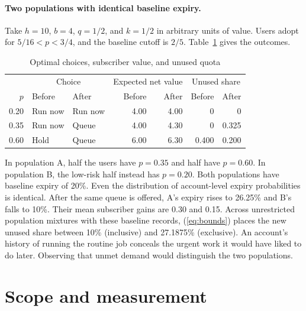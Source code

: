 \documentclass[11pt]{article}
\begin{document}
\paragraph{Two populations with identical baseline expiry.}
Take $h=10$, $b=4$, $q=1/2$, and $k=1/2$ in arbitrary units of value. Users adopt for $5/16<p<3/4$, and the baseline cutoff is $2/5$. Table~\ref{tab:types} gives the outcomes.
\begin{table}[ht]
\centering
\caption{Optimal choices, subscriber value, and unused quota}\label{tab:types}
\begin{tabular}{@{}rllrrrr@{}}\toprule
& \multicolumn{2}{c}{Choice} & \multicolumn{2}{c}{Expected net value} &
\multicolumn{2}{c}{Unused share}\\
$p$ & Before & After & Before & After & Before & After \\ \midrule
0.20 & Run now & Run now & 4.00 & 4.00 & 0 & 0 \\
0.35 & Run now & Queue & 4.00 & 4.30 & 0 & 0.325 \\
0.60 & Hold & Queue & 6.00 & 6.30 & 0.400 & 0.200 \\ \bottomrule
\end{tabular}
\end{table}

In population A, half the users have $p=0.35$ and half have $p=0.60$. In population B, the low-risk half instead has $p=0.20$. Both populations have baseline expiry of 20\%. Even the distribution of account-level expiry probabilities is identical. After the same queue is offered, A's expiry rises to 26.25\% and B's falls to 10\%. Their mean subscriber gains are 0.30 and 0.15. Across unrestricted population mixtures with these baseline records, (\ref{eq:bounds}) places the new unused share between 10\% (inclusive) and 27.1875\% (exclusive). An account's history of running the routine job conceals the urgent work it would have liked to do later. Observing that unmet demand would distinguish the two populations.

\section{Scope and measurement}
\end{document}

